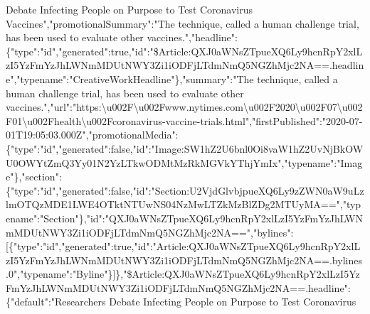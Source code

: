 Debate Infecting People on Purpose to Test Coronavirus
Vaccines","promotionalSummary":"The technique, called a human challenge
trial, has been used to evaluate other
vaccines.","headline":\{"type":"id","generated":true,"id":"\$Article:QXJ0aWNsZTpueXQ6Ly9hcnRpY2xlLzI5YzFmYzJhLWNmMDUtNWY3Zi1iODFjLTdmNmQ5NGZhMjc2NA==.headline","typename":"CreativeWorkHeadline"\},"summary":"The
technique, called a human challenge trial, has been used to evaluate
other
vaccines.","url":"https:\textbackslash{}u002F\textbackslash{}u002Fwww.nytimes.com\textbackslash{}u002F2020\textbackslash{}u002F07\textbackslash{}u002F01\textbackslash{}u002Fhealth\textbackslash{}u002Fcoronavirus-vaccine-trials.html","firstPublished":"2020-07-01T19:05:03.000Z","promotionalMedia":\{"type":"id","generated":false,"id":"Image:SW1hZ2U6bnl0Oi8vaW1hZ2UvNjBkOWU0OWYtZmQ3Yy01N2YzLTkwODMtMzRkMGVkYThjYmIx","typename":"Image"\},"section":\{"type":"id","generated":false,"id":"Section:U2VjdGlvbjpueXQ6Ly9zZWN0aW9uLzlmOTQzMDE1LWE4OTktNTUwNS04NzMwLTZkMzBlZDg2MTUyMA==","typename":"Section"\},"id":"QXJ0aWNsZTpueXQ6Ly9hcnRpY2xlLzI5YzFmYzJhLWNmMDUtNWY3Zi1iODFjLTdmNmQ5NGZhMjc2NA==","bylines":{[}\{"type":"id","generated":true,"id":"Article:QXJ0aWNsZTpueXQ6Ly9hcnRpY2xlLzI5YzFmYzJhLWNmMDUtNWY3Zi1iODFjLTdmNmQ5NGZhMjc2NA==.bylines.0","typename":"Byline"\}{]}\},"\$Article:QXJ0aWNsZTpueXQ6Ly9hcnRpY2xlLzI5YzFmYzJhLWNmMDUtNWY3Zi1iODFjLTdmNmQ5NGZhMjc2NA==.headline":\{"default":"Researchers
Debate Infecting People on Purpose to Test Coronavirus
